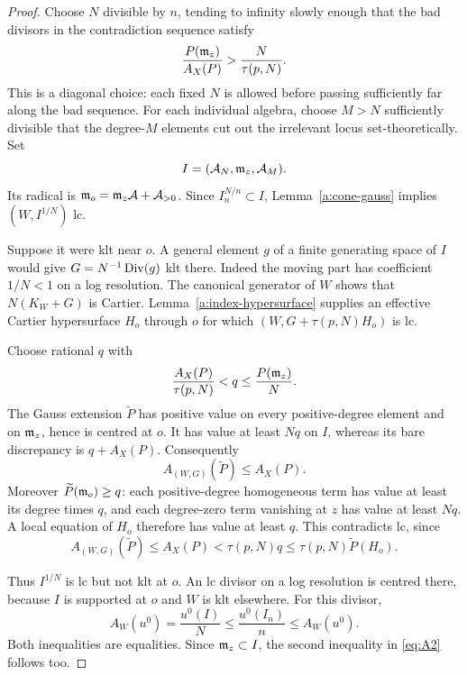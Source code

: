 \begin{proof}
Choose \(N\) divisible by \(n\), tending to infinity slowly enough that
the bad divisors in the contradiction sequence satisfy
\[
 \frac{P(\mathfrak m_z)}{A_X(P)}>\frac{N}{\tau(p,N)}.
\]
This is a diagonal choice: each fixed \(N\) is allowed before passing
sufficiently far along the bad sequence. For each individual algebra,
choose \(M>N\) sufficiently divisible that the degree-\(M\) elements
cut out the irrelevant locus set-theoretically. Set
\[
                  I=(\mathcal A_N,\mathfrak m_z,\mathcal A_M).
\]
Its radical is
\(\mathfrak m_o=\mathfrak m_z\mathcal A+\mathcal A_{>0}\).
Since \(I_n^{N/n}\subset I\), Lemma~\ref{a:cone-gauss} implies
\((W,I^{1/N})\) lc.

Suppose it were klt near \(o\). A general element \(g\) of a finite
generating space of \(I\) would give
\(G=N^{-1}\operatorname{Div}(g)\) klt there. Indeed the moving part has coefficient
\(1/N<1\) on a log resolution. The canonical generator of \(W\) shows
that \(N(K_W+G)\) is Cartier. Lemma~\ref{a:index-hypersurface} supplies
an effective Cartier hypersurface \(H_o\) through \(o\) for which
\((W,G+\tau(p,N)H_o)\) is lc.

Choose rational \(q\) with
\[
       \frac{A_X(P)}{\tau(p,N)}<q\leq\frac{P(\mathfrak m_z)}N .
\]
The Gauss extension \(\widetilde P\) has positive value on every
positive-degree element and on \(\mathfrak m_z\), hence is centred at \(o\).
It has value at least \(Nq\) on \(I\), whereas its bare discrepancy is
\(q+A_X(P)\). Consequently
\[
                  A_{(W,G)}(\widetilde P)\leq A_X(P).
\]
Moreover \(\widetilde P(\mathfrak m_o)\geq q\): each positive-degree homogeneous
term has value at least its degree times \(q\), and each degree-zero
term vanishing at \(z\) has value at least \(Nq\).
A local equation of \(H_o\) therefore has value at least \(q\).
This contradicts lc, since
\[
 A_{(W,G)}(\widetilde P)\leq A_X(P)
       <\tau(p,N)q\leq\tau(p,N)\widetilde P(H_o).
\]

Thus \(I^{1/N}\) is lc but not klt at \(o\). An lc divisor on a log
resolution is centred there, because \(I\) is supported at \(o\) and
\(W\) is klt elsewhere. For this divisor,
\[
 A_W(u^0)=\frac{u^0(I)}N
       \leq\frac{u^0(I_n)}n\leq A_W(u^0).
\]
Both inequalities are equalities. Since \(\mathfrak m_z\subset I\), the second
inequality in \eqref{eq:A2} follows too.
\end{proof}
